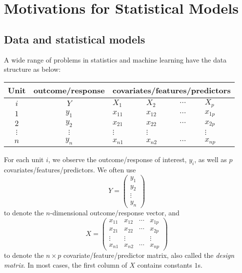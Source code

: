  
\chapter{Motivations for Statistical Models}\label{chapter::motivation}
 

\section{Data and statistical models}
A wide range of problems in statistics and machine learning have the data structure as below: 

 
\begin{tabular}{|c|c|p{1cm}|p{1cm}|p{1cm}|p{1cm}|}
Unit & outcome/response & \multicolumn{4}{c|}{covariates/features/predictors}\tabularnewline
\hline 
\hline 
$i$ & $Y$ & $X_{1}$ & $X_{2}$ & $\cdots$ & $X_{p}$\tabularnewline
\hline 
$1$ & $y_{1}$ & $x_{11}$ & $x_{12}$ & $\cdots$ & $x_{1p}$\tabularnewline
\hline 
$2$ & $y_{2}$ & $x_{21}$ & $x_{22}$ & $\cdots$ & $x_{2p}$\tabularnewline
\hline 
$\vdots$ & $\vdots$ & $\vdots$ & $\vdots$ &  & $\vdots$\tabularnewline
\hline 
$n$ & $y_{n}$ & $x_{n1}$ & $x_{n2}$ & $\cdots$ & $x_{np}$\tabularnewline
\end{tabular}
 
 
For each unit $i$, we observe the outcome/response of interest, $y_i$, as well as $p$  covariates/features/predictors. 
We often use 
\[
Y=\left(\begin{array}{c}
y_{1}\\
y_{2}\\
\vdots\\
y_{n}
\end{array}\right)
\]
to denote the $n$-dimensional outcome/response vector, and 
\[
X=\left(\begin{array}{cccc}
x_{11} & x_{12} & \cdots & x_{1p}\\
x_{21} & x_{22} & \cdots & x_{2p}\\
\vdots & \vdots &  & \vdots\\
x_{n1} & x_{n2} & \cdots & x_{np}
\end{array}\right)
\]
to denote the $n\times p$ covariate/feature/predictor matrix, also called the {\it design matrix}. In
most cases, the first column of $X$ contains constants $1$s. 

